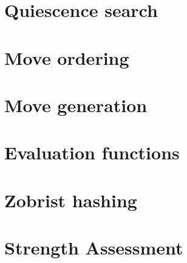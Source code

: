 \section{Quiescence search}

\section{Move ordering}

\section{Move generation}

\section{Evaluation functions}

\section{Zobrist hashing}

\section{Strength Assessment}





